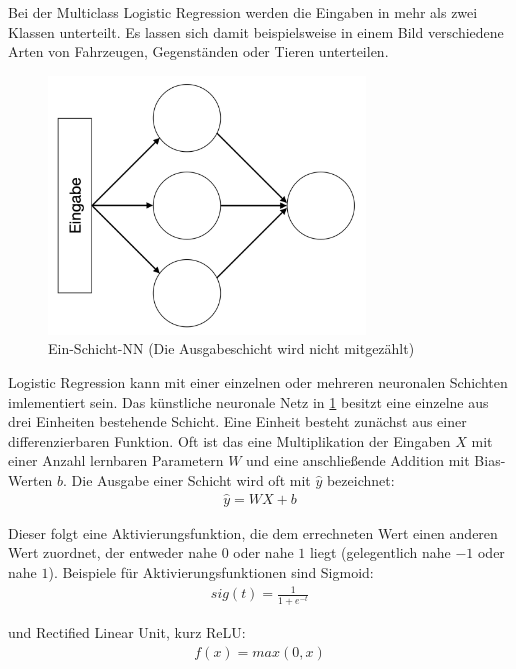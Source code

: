Bei der Multiclass Logistic Regression werden die Eingaben in mehr als zwei Klassen unterteilt. Es lassen sich damit beispielsweise in einem Bild  verschiedene Arten von Fahrzeugen, Gegenständen oder Tieren unterteilen.

\begin{figure}[h]
	\centering
	\includegraphics[width=0.75\textwidth]{bilder/singlelayernn.png}
	\caption[Ein-Schicht-NN]{Ein-Schicht-NN (Die Ausgabeschicht wird nicht mitgezählt)}
	\label{fig:singlelayernn}
\end{figure}

Logistic Regression kann mit einer einzelnen oder mehreren neuronalen Schichten imlementiert sein. Das künstliche neuronale Netz in \ref{fig:singlelayernn} besitzt eine einzelne aus drei Einheiten bestehende Schicht. Eine Einheit besteht zunächst aus einer differenzierbaren Funktion. Oft ist das eine Multiplikation der Eingaben $X$ mit einer Anzahl lernbaren Parametern $W$ und eine anschließende Addition mit Bias-Werten $b$. Die Ausgabe einer Schicht wird oft mit $\hat{y}$ bezeichnet:
\begin{align}
\hat{y} = WX+b
\end{align}

Dieser folgt eine Aktivierungsfunktion, die dem errechneten Wert einen anderen Wert zuordnet, der entweder nahe $0$ oder nahe $1$ liegt (gelegentlich nahe $-1$ oder nahe $1$). Beispiele für Aktivierungsfunktionen sind Sigmoid:
\begin{align}
sig(t) = \frac{1}{1+e^{-t}}
\end{align}

und Rectified Linear Unit, kurz ReLU:
\begin{align}
f(x) = max(0, x)
\end{align}

